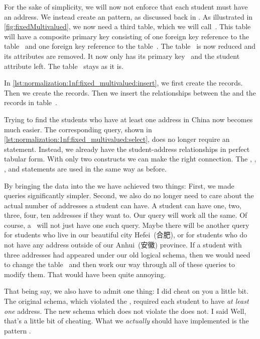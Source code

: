 For the sake of simplicity, we will now not enforce that each student must have an address.
We instead create an  pattern, as discussed back in .
As illustrated in \cref{fig:fixedMultivalued}, we now need a third table, which we will call~.
This table will have a composite primary key consisting of one foreign key reference to the table~ and one foreign key reference to the table~.
The table~ is now reduced and its  attributes are removed.
It now only has its primary key~ and the student~ attribute left.
The table~ stays as it is.

In \cref{lst:normalization:1nf:fixed_multivalued:insert}, we first create the  records.
Then we create the  records.
Then we insert the relationships between the  and the  records in table~.

Trying to find the students who have at least one address in China now becomes much easier.
The corresponding query, shown in \cref{lst:normalization:1nf:fixed_multivalued:select}, does no longer require an  statement.
Instead, we already have the student-address relationships in perfect tabular form.
With only two  constructs we can make the right connection.
The , , , and  statements are used in the same way as before.

By bringing the data into the  we have achieved two things:
First, we made queries significantly simpler.
Second, we also do no longer need to care about the actual number of addresses a student can have.
A student can have one, two, three, four, ten addresses if they want to.
Our query will work all the same.
Of course, a \db\ will not just have one such query.
Maybe there will be another query for students who live in our beautiful city Hefei~(合肥), or for students who do not have any address outside of our Anhui~(安徽) province.
If a student with three addresses had appeared under our old logical schema, then we would need to change the table~ and then work our way through all of these queries to modify them.
That would have been quite annoying.

That being say, we also have to admit one thing:
I did cheat on you a little bit.
The original schema, which violated the , required each student to have \emph{at least one} address.
The new schema which does not violate the  does not.
I said \emph{}
Well, that's a little bit of cheating.
What we \emph{actually} should have implemented is the pattern .

